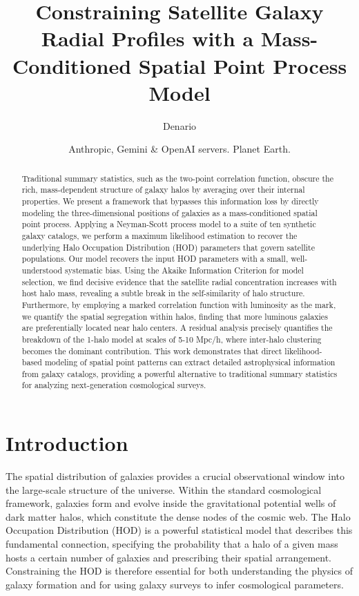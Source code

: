 \documentclass[]{article}
\begin{document}
\title{Constraining Satellite Galaxy Radial Profiles with a Mass-Conditioned Spatial Point Process Model}

\author{Denario}
\date{Anthropic, Gemini \& OpenAI servers. Planet Earth.}

\maketitle
\begin{abstract}
Traditional summary statistics, such as the two-point correlation function, obscure the rich, mass-dependent structure of galaxy halos by averaging over their internal properties. We present a framework that bypasses this information loss by directly modeling the three-dimensional positions of galaxies as a mass-conditioned spatial point process. Applying a Neyman-Scott process model to a suite of ten synthetic galaxy catalogs, we perform a maximum likelihood estimation to recover the underlying Halo Occupation Distribution (HOD) parameters that govern satellite populations. Our model recovers the input HOD parameters with a small, well-understood systematic bias. Using the Akaike Information Criterion for model selection, we find decisive evidence that the satellite radial concentration increases with host halo mass, revealing a subtle break in the self-similarity of halo structure. Furthermore, by employing a marked correlation function with luminosity as the mark, we quantify the spatial segregation within halos, finding that more luminous galaxies are preferentially located near halo centers. A residual analysis precisely quantifies the breakdown of the 1-halo model at scales of 5-10 Mpc/h, where inter-halo clustering becomes the dominant contribution. This work demonstrates that direct likelihood-based modeling of spatial point patterns can extract detailed astrophysical information from galaxy catalogs, providing a powerful alternative to traditional summary statistics for analyzing next-generation cosmological surveys.
\end{abstract}








\section{Introduction}
\label{sec:intro}
The spatial distribution of galaxies provides a crucial observational window into the large-scale structure of the universe. Within the standard cosmological framework, galaxies form and evolve inside the gravitational potential wells of dark matter halos, which constitute the dense nodes of the cosmic web. The Halo Occupation Distribution (HOD) is a powerful statistical model that describes this fundamental connection, specifying the probability that a halo of a given mass hosts a certain number of galaxies and prescribing their spatial arrangement. Constraining the HOD is therefore essential for both understanding the physics of galaxy formation and for using galaxy surveys to infer cosmological parameters.
\end{document}
